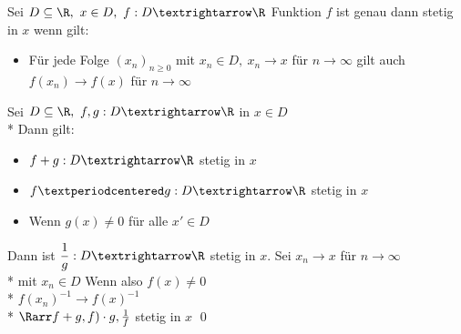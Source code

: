 Sei $D\subseteq\R,\ x\in D,\ f:D→\R$ Funktion $f$ ist genau dann stetig in $x$ wenn gilt:
\begin{itemize}
\item{Für jede Folge $(x_n)_{n\geq 0}$ mit $x_n\in D,\ x_n→x$ für $n→∞$ gilt auch $f(x_n)→f(x)$ für $n→∞$}
\end{itemize}

Sei $D\subseteq\R,\ f,g:D→\R$ in $x\in D$\\*
Dann gilt:
\begin{itemize}
\item{$f+g:D→\R$ stetig in $x$}
\item{$f·g:D→\R$ stetig in $x$}
\item{Wenn $g(x)\neq 0$ für alle $x'\in D$}
\end{itemize}
Dann ist $\dfrac{1}{g}:D→\R$ stetig in $x$.
Sei $x_n \to x$ für $n \to \infty$\\*
mit $x_n \in D$
Wenn also $f(x) \neq 0$\\*
$f(x_n)^{-1} \to f(x)^{-1}$\\*
$\Rarr f + g, f) \cdot g, \frac{1}{f}$ stetig in $x$ \qed